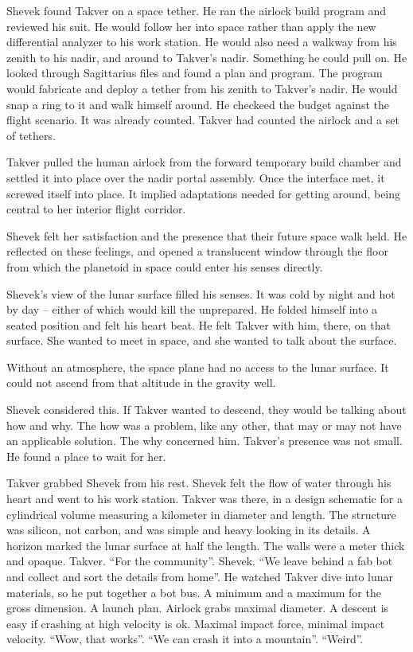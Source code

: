 Shevek found Takver on a space tether.  He ran the airlock build
program and reviewed his suit.  He would follow her into space rather
than apply the new differential analyzer to his work station.  He
would also need a walkway from his zenith to his nadir, and around to
Takver's nadir.  Something he could pull on.  He looked through
Sagittarius files and found a plan and program.  The program would
fabricate and deploy a tether from his zenith to Takver's nadir.  He
would snap a ring to it and walk himself around.  He checkeed the
budget against the flight scenario.  It was already counted.  Takver
had counted the airlock and a set of tethers.

Takver pulled the human airlock from the forward temporary build
chamber and settled it into place over the nadir portal assembly.
Once the interface met, it screwed itself into place.  It implied
adaptations needed for getting around, being central to her interior
flight corridor.

Shevek felt her satisfaction and the presence that their future space
walk held.  He reflected on these feelings, and opened a translucent
window through the floor from which the planetoid in space could enter
his senses directly.

Shevek's view of the lunar surface filled his senses.  It was cold by
night and hot by day -- either of which would kill the unprepared.  He
folded himself into a seated position and felt his heart beat.  He
felt Takver with him, there, on that surface.  She wanted to meet in
space, and she wanted to talk about the surface.

Without an atmosphere, the space plane had no access to the lunar
surface.  It could not ascend from that altitude in the gravity well.

Shevek considered this.  If Takver wanted to descend, they would be
talking about how and why.  The how was a problem, like any other,
that may or may not have an applicable solution.  The why concerned
him.  Takver's presence was not small.  He found a place to wait for
her.

Takver grabbed Shevek from his rest.  Shevek felt the flow of water
through his heart and went to his work station.  Takver was there, in
a design schematic for a cylindrical volume measuring a kilometer in
diameter and length.  The structure was silicon, not carbon, and was
simple and heavy looking in its details.  A horizon marked the lunar
surface at half the length.  The walls were a meter thick and opaque.
Takver.  ``For the community''.  Shevek.  ``We leave behind a fab bot
and collect and sort the details from home''.  He watched Takver dive
into lunar materials, so he put together a bot bus.  A minimum and a
maximum for the gross dimension.  A launch plan.  Airlock grabs
maximal diameter.  A descent is easy if crashing at high velocity is
ok.  Maximal impact force, minimal impact velocity.  ``Wow, that
works''.  ``We can crash it into a mountain''.  ``Weird''.

